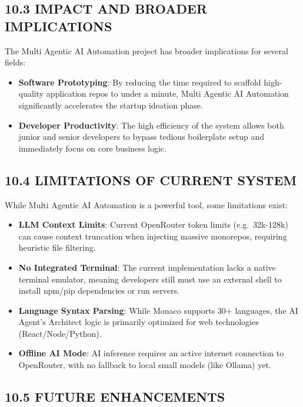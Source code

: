 \documentclass[
  12pt,
]{article}
\providecommand{\tightlist}{%
  \setlength{\itemsep}{0pt}\setlength{\parskip}{0pt}}
\begin{document}
\subsection{10.3 IMPACT AND BROADER
IMPLICATIONS}\label{impact-and-broader-implications}

The Multi Agentic AI Automation project has broader implications for
several fields:

\begin{itemize}
\tightlist
\item
  \textbf{Software Prototyping}: By reducing the time required to
  scaffold high-quality application repos to under a minute, Multi
  Agentic AI Automation significantly accelerates the startup ideation
  phase.
\item
  \textbf{Developer Productivity}: The high efficiency of the system
  allows both junior and senior developers to bypass tedious boilerplate
  setup and immediately focus on core business logic.
\end{itemize}

\subsection{10.4 LIMITATIONS OF CURRENT
SYSTEM}\label{limitations-of-current-system}

While Multi Agentic AI Automation is a powerful tool, some limitations
exist:

\begin{itemize}
\tightlist
\item
  \textbf{LLM Context Limits}: Current OpenRouter token limits
  (e.g.~32k-128k) can cause context truncation when injecting massive
  monorepos, requiring heuristic file filtering.
\item
  \textbf{No Integrated Terminal}: The current implementation lacks a
  native terminal emulator, meaning developers still must use an
  external shell to install npm/pip dependencies or run servers.
\item
  \textbf{Language Syntax Parsing}: While Monaco supports 30+ languages,
  the AI Agent's Architect logic is primarily optimized for web
  technologies (React/Node/Python).
\item
  \textbf{Offline AI Mode}: AI inference requires an active internet
  connection to OpenRouter, with no fallback to local small models (like
  Ollama) yet.
\end{itemize}

\subsection{10.5 FUTURE ENHANCEMENTS}\label{future-enhancements}
\end{document}
